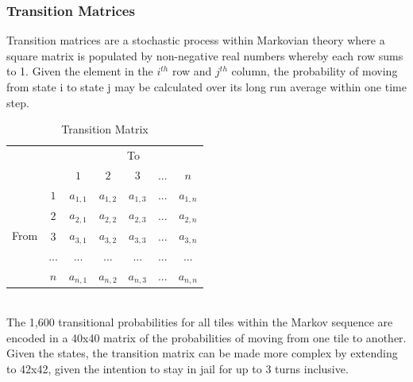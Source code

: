 \documentclass[12pt]{article}
\begin{document}
\subsubsection{Transition Matrices}
Transition matrices are a stochastic process within Markovian theory where a square matrix is populated by non-negative real numbers whereby each row sums to 1. Given the element in the $i^{th}$ row and $j^{th}$ column, the probability of moving from state i to state j may be calculated over its long run average within one time step.
\begin{table}[h]
\centering
\label{Transition Matrix}
\begin{tabular}{ccccccc}
                                           &                        & \multicolumn{5}{c}{To}                                                                                                     \\ \cline{3-7} 
                                           & \multicolumn{1}{c|}{}  & \multicolumn{1}{c|}{$1$} & \multicolumn{1}{c|}{$2$} & \multicolumn{1}{c|}{$3$} & \multicolumn{1}{c|}{...} & \multicolumn{1}{c|}{$n$} \\ \cline{2-7} 
\multicolumn{1}{c|}{\multirow{5}{*}{From}} & \multicolumn{1}{c|}{$1$} & \multicolumn{1}{c|}{$a_{1,1}$}  & \multicolumn{1}{c|}{$a_{1,2}$}  & \multicolumn{1}{c|}{$a_{1,3}$}  & \multicolumn{1}{c|}{...}  & \multicolumn{1}{c|}{$a_{1,n}$}  \\ \cline{2-7} 
\multicolumn{1}{c|}{}                      & \multicolumn{1}{c|}{$2$} & \multicolumn{1}{c|}{$a_{2,1}$}  & \multicolumn{1}{c|}{$a_{2,2}$}  & \multicolumn{1}{c|}{$a_{2,3}$}  & \multicolumn{1}{c|}{...}  & \multicolumn{1}{c|}{$a_{2,n}$}  \\ \cline{2-7} 
\multicolumn{1}{c|}{}                      & \multicolumn{1}{c|}{$3$} & \multicolumn{1}{c|}{$a_{3,1}$}  & \multicolumn{1}{c|}{$a_{3,2}$}  & \multicolumn{1}{c|}{$a_{3,3}$}  & \multicolumn{1}{c|}{...}  & \multicolumn{1}{c|}{$a_{3,n}$}  \\ \cline{2-7} 
\multicolumn{1}{c|}{}                      & \multicolumn{1}{c|}{...} & \multicolumn{1}{c|}{...}  & \multicolumn{1}{c|}{...}  & \multicolumn{1}{c|}{...}  & \multicolumn{1}{c|}{...}  & \multicolumn{1}{c|}{...}  \\ \cline{2-7} 
\multicolumn{1}{c|}{}                      & \multicolumn{1}{c|}{$n$} & \multicolumn{1}{c|}{$a_{n,1}$}  & \multicolumn{1}{c|}{$a_{n,2}$}  & \multicolumn{1}{c|}{$a_{n,3}$}  & \multicolumn{1}{c|}{...}  & \multicolumn{1}{c|}{$a_{n,n}$}  \\ \cline{2-7} 
\end{tabular}
\caption{Transition Matrix}
\end{table}
\\
The 1,600 transitional probabilities for all tiles within the Markov sequence are encoded in a 40x40 matrix of the probabilities of moving from one tile to another. Given the states, the transition matrix can be made more complex by extending to 42x42, given the intention to stay in jail for up to 3 turns inclusive.
\end{document}
